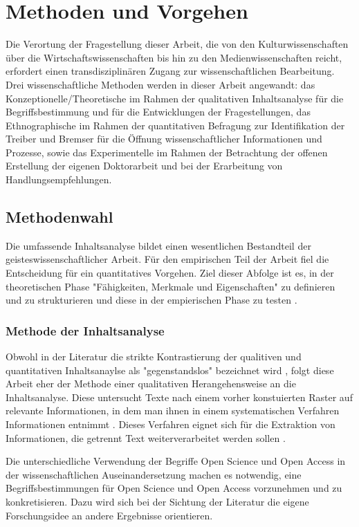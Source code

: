 \chapter{Methoden und Vorgehen}
Die Verortung der Fragestellung dieser Arbeit, die von den Kulturwissenschaften über die Wirtschaftswissenschaften bis hin zu den Medienwissenschaften reicht, erfordert einen transdisziplinären Zugang zur wissenschaftlichen Bearbeitung. Drei wissenschaftliche Methoden werden in dieser Arbeit angewandt: das Konzeptionelle/Theoretische im Rahmen der qualitativen Inhaltsanalyse für die Begriffsbestimmung und für die Entwicklungen der Fragestellungen, das Ethnographische im Rahmen der quantitativen Befragung zur Identifikation der Treiber und Bremser für die Öffnung wissenschaftlicher Informationen und Prozesse, sowie das Experimentelle im Rahmen der Betrachtung der offenen Erstellung der eigenen Doktorarbeit und bei der Erarbeitung von Handlungsempfehlungen. 

\section{Methodenwahl}

Die umfassende Inhaltsanalyse bildet einen wesentlichen Bestandteil der geisteswissenschaftlicher Arbeit. Für den empirischen Teil der Arbeit fiel die Entscheidung für ein quantitatives Vorgehen. Ziel dieser Abfolge ist es, in der theoretischen Phase "Fähigkeiten, Merkmale und Eigenschaften" zu definieren und zu strukturieren und diese in der empierischen Phase zu testen \cite{raab_2012_fragebogen}.

\subsection{Methode der Inhaltsanalyse}
Obwohl in der Literatur die strikte Kontrastierung der qualitiven und quantitativen Inhaltsanaylse als "gegenstandslos" bezeichnet wird \cite{frueh_2011_inhaltsanalyse}, folgt diese Arbeit eher der Methode einer qualitativen Herangehensweise an die Inhaltsanalyse. Diese untersucht Texte nach einem vorher konstuierten Raster auf relevante Informationen, in dem man ihnen in einem systematischen Verfahren Informationen entnimmt \cite{glaser_1999_theorie_analyse}. Dieses Verfahren eignet sich für die Extraktion von Informationen, die getrennt Text weiterverarbeitet werden sollen \cite{glaser_1999_theorie_analyse}.

Die unterschiedliche Verwendung der Begriffe Open Science und Open Access in der wissenschaftlichen Auseinandersetzung machen es notwendig, eine Begriffsbestimmungen für Open Science und Open Access vorzunehmen und zu konkretisieren. Dazu wird sich bei der Sichtung der Literatur die eigene Forschungsidee an andere Ergebnisse orientieren.  


